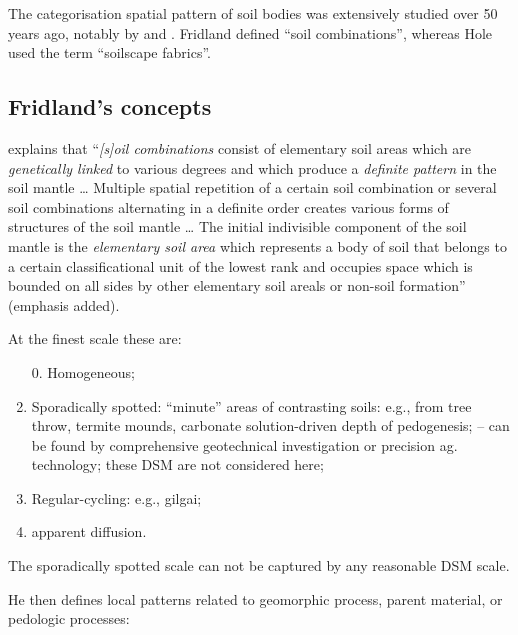 \documentclass[soil, manuscript]{copernicus}
\begin{document}
\par
The categorisation spatial pattern of soil bodies was extensively studied over 50 years ago, notably by \citet{Fridland1972,Fridland1974} and \citet{holeApproachLandscapeAnalysis1978, holeSoilLandscapeAnalysis1985}.
%
Fridland defined ``soil combinations'', whereas Hole used the term ``soilscape fabrics''.
%

\subsection{Fridland's concepts}

\par
\citet{Fridland1974} explains that ``\emph{[s]oil combinations} consist of elementary soil areas which are \emph{genetically linked} to various degrees and which produce a \emph{definite pattern} in the soil mantle
%
\ldots
%
Multiple spatial repetition of a certain soil combination or several soil combinations alternating in a definite order creates various forms of structures of the soil mantle
%
\ldots
%
The initial indivisible component of the soil mantle is the \emph{elementary soil area} which represents a body of soil that belongs to a certain classificational unit of the lowest rank and occupies space which is bounded on all sides by other elementary soil areals or non-soil formation'' (emphasis added).

\par
At the finest scale these are:

\begin{enumerate}
\item[0.] Homogeneous;
\item Sporadically spotted: ``minute'' areas of contrasting soils: e.g., from tree throw, termite mounds,  carbonate solution-driven  depth of pedogenesis;
-- can be found by comprehensive geotechnical investigation or precision ag. technology; these DSM are not considered here;
\item Regular-cycling: e.g.,  gilgai;
\item apparent diffusion.
\end{enumerate}

The sporadically spotted scale can not be captured by any reasonable DSM scale.

He then defines local patterns related to geomorphic process, parent material, or pedologic processes:
\end{document}
